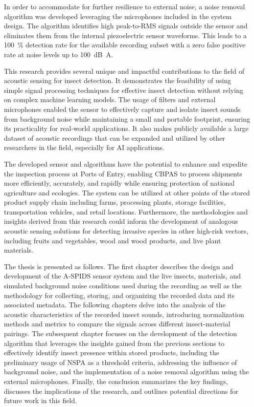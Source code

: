 \documentclass[../Vibro-Acoustic Signatures and Detection Algorithms for Stored Product Insects.tex]{subfiles}
\begin{document}
In order to accommodate for further resilience to external noise, a noise removal algorithm was developed leveraging the microphones included in the system design. The algorithm identifies high peak-to-RMS signals outside the sensor and eliminates them from the internal piezoelectric sensor waveforms. This leads to a \SI{100}{\percent} detection rate for the available recording subset with a zero false positive rate at noise levels up to \SI{100}{\deci\bel A}.

This research provides several unique and impactful contributions to the field of acoustic sensing for insect detection. It demonstrates the feasibility of using simple signal processing techniques for effective insect detection without relying on complex machine learning models. The usage of filters and external microphones enabled the sensor to effectively capture and isolate insect sounds from background noise while maintaining a small and portable footprint, ensuring its practicality for real-world applications. It also makes publicly available a large dataset of acoustic recordings that can be expanded and utilized by other researchers in the field, especially for AI applications. 

The developed sensor and algorithms have the potential to enhance and expedite the inspection process at Ports of Entry, enabling CBPAS to process shipments more efficiently, accurately, and rapidly while ensuring protection of national agriculture and ecologies. The system can be utilized at other points of the stored product supply chain including farms, processing plants, storage facilities, transportation vehicles, and retail locations. Furthermore, the methodologies and insights derived from this research could inform the development of analogous acoustic sensing solutions for detecting invasive species in other high-risk vectors, including fruits and vegetables, wood and wood products, and live plant materials.

The thesis is presented as follows. The first chapter describes the design and development of the A-SPIDS sensor system and the live insects, materials, and simulated background noise conditions used during the recording as well as the methodology for collecting, storing, and organizing the recorded data and its associated metadata. The following chapters delve into the analysis of the acoustic characteristics of the recorded insect sounds, introducing normalization methods and metrics to compare the signals across different insect-material pairings. The subsequent chapter focuses on the development of the detection algorithm that leverages the insights gained from the previous sections to effectively identify insect presence within stored products, including the preliminary usage of NSPA as a threshold criteria, addressing the influence of background noise, and the implementation of a noise removal algorithm using the external microphones. Finally, the conclusion summarizes the key findings, discusses the implications of the research, and outlines potential directions for future work in this field.

\newpage
\end{document}
